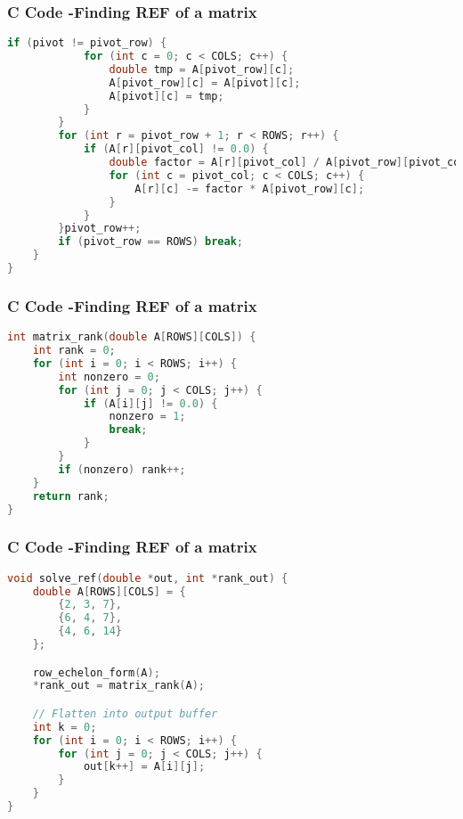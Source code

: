 \documentclass{beamer}
\begin{document}
\begin{frame}[fragile]
    \frametitle{C Code -Finding REF of a matrix}

    \begin{lstlisting}[language=C]
        if (pivot != pivot_row) {
            for (int c = 0; c < COLS; c++) {
                double tmp = A[pivot_row][c];
                A[pivot_row][c] = A[pivot][c];
                A[pivot][c] = tmp;
            }
        }
        for (int r = pivot_row + 1; r < ROWS; r++) {
            if (A[r][pivot_col] != 0.0) {
                double factor = A[r][pivot_col] / A[pivot_row][pivot_col];
                for (int c = pivot_col; c < COLS; c++) {
                    A[r][c] -= factor * A[pivot_row][c];
                }
            }
        }pivot_row++;
        if (pivot_row == ROWS) break;
    }
}

    \end{lstlisting}
\end{frame}

\begin{frame}[fragile]
    \frametitle{C Code -Finding REF of a matrix}

    \begin{lstlisting}[language=C]
int matrix_rank(double A[ROWS][COLS]) {
    int rank = 0;
    for (int i = 0; i < ROWS; i++) {
        int nonzero = 0;
        for (int j = 0; j < COLS; j++) {
            if (A[i][j] != 0.0) {
                nonzero = 1;
                break;
            }
        }
        if (nonzero) rank++;
    }
    return rank;
}
    \end{lstlisting}
\end{frame}

\begin{frame}[fragile]
    \frametitle{C Code -Finding REF of a matrix}

    \begin{lstlisting}[language=C]
void solve_ref(double *out, int *rank_out) {
    double A[ROWS][COLS] = {
        {2, 3, 7},
        {6, 4, 7},
        {4, 6, 14}
    };

    row_echelon_form(A);
    *rank_out = matrix_rank(A);

    // Flatten into output buffer
    int k = 0;
    for (int i = 0; i < ROWS; i++) {
        for (int j = 0; j < COLS; j++) {
            out[k++] = A[i][j];
        }
    }
}
    \end{lstlisting}
\end{frame}
\end{document}
